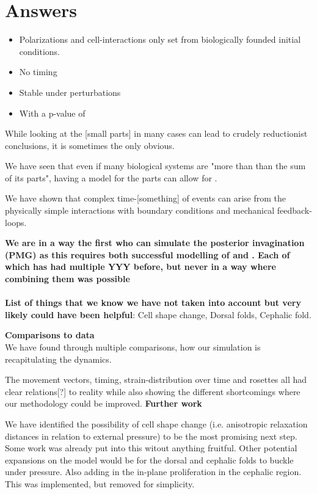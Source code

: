 \section{Answers}
\begin{itemize}
    \item Polarizations and cell-interactions only set from biologically founded initial conditions.
    \item No  timing
    \item Stable under perturbations
    \item With a p-value of 
\end{itemize}

While looking at the [small parts] in many cases can lead to crudely reductionist conclusions, it is sometimes the only obvious.

We have seen that even if many biological systems are "more than than the sum of its parts", having a model for the parts can allow for .

We have shown that complex time-[something] of events can arise from the physically simple interactions with boundary conditions and mechanical feedback-loops.

\textbf{We are in a way the first who can simulate the posterior invagination (PMG)  as this requires both successful modelling of  and . Each of which has had multiple YYY before, but never in a way where combining them was possible}\\\\


\textbf{List of things that we know we have not taken into account but very likely could have been helpful}:
Cell shape change, Dorsal folds, Cephalic fold.

\textbf{Comparisons to data}\\
We have found through multiple comparisons, how our simulation is recapitulating the dynamics.

The movement vectors, timing, strain-distribution over time and rosettes all had clear relations[?] to reality while also showing the different shortcomings where our methodology could be improved.
\textbf{Further work}

We have identified the possibility of cell shape change (i.e. anisotropic relaxation distances in relation to external pressure) to be the most promising next step. Some work was already put into this witout anything fruitful. Other potential expansions on the model would be for the dorsal and cephalic folds to buckle under pressure. Also adding in the in-plane proliferation in the cephalic region. This was implemented, but removed for simplicity.

